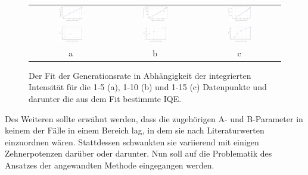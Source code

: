 \begin{figure}[H]
\begin{tabular}{ccc}
  \includegraphics[width=0.30\textwidth]{Bilder/RaumtempBilder/genfit1-5.png} & \includegraphics[width=0.32\textwidth]{Bilder/RaumtempBilder/genfit1-10.png}  & \includegraphics[width=0.30\textwidth]{Bilder/RaumtempBilder/genfit1-15.png} \\
 \includegraphics[width=0.30\textwidth]{Bilder/RaumtempBilder/iqe1-5.png} &   \includegraphics[width=0.30\textwidth]{Bilder/RaumtempBilder/iqe1-10.png} & \includegraphics[width=0.30\textwidth]{Bilder/RaumtempBilder/iqe1-15.png}  \\
 a & b & c
\end{tabular}
\caption{Der Fit der Generationsrate in Abhängigkeit der integrierten Intensität für die 1-5 (a), 1-10 (b) und 1-15 (c) Datenpunkte und darunter die aus dem Fit bestimmte IQE.}
\label{fig:raumtemp}
\end{figure}
\noindent 
Des Weiteren sollte erwähnt werden, dass die zugehörigen A- und B-Parameter in keinem der Fälle in einem Bereich lag, in dem sie nach Literaturwerten einzuordnen wären. Stattdessen schwankten sie variierend mit einigen Zehnerpotenzen darüber oder darunter. 
Nun soll auf die Problematik des Ansatzes der angewandten Methode eingegangen werden. 


